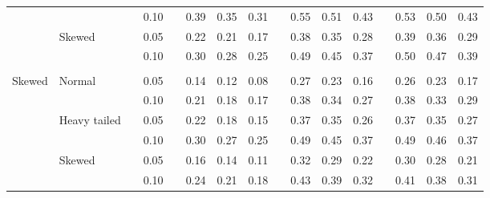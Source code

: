 \documentclass[12pt]{article} %
\begin{document}
\begin{table}[ht]
\begin{scriptsize}
\begin{center}
\begin{tabular}{ll p{.1cm} c p{.1cm} rrr p{.1cm} rrr p{.1cm} rrr}
             &              && 0.10 &&   0.39 & 0.35 & 0.31 && 0.55 & 0.51 & 0.43 &&  0.53 & 0.50 & 0.43 \\
             & Skewed       && 0.05 &&   0.22 & 0.21 & 0.17 && 0.38 & 0.35 & 0.28 &&  0.39 & 0.36 & 0.29 \\
             &              && 0.10 &&   0.30 & 0.28 & 0.25 && 0.49 & 0.45 & 0.37 &&  0.50 & 0.47 & 0.39 \\
             &&&&&&&&&&&&&&&\\
Skewed       & Normal       && 0.05 &&   0.14 & 0.12 & 0.08 && 0.27 & 0.23 & 0.16 &&  0.26 & 0.23 & 0.17 \\
             &              && 0.10 &&   0.21 & 0.18 & 0.17 && 0.38 & 0.34 & 0.27 &&  0.38 & 0.33 & 0.29 \\
             & Heavy tailed && 0.05 &&   0.22 & 0.18 & 0.15 && 0.37 & 0.35 & 0.26 &&  0.37 & 0.35 & 0.27 \\
             &              && 0.10 &&   0.30 & 0.27 & 0.25 && 0.49 & 0.45 & 0.37 &&  0.49 & 0.46 & 0.37 \\
             & Skewed       && 0.05 &&   0.16 & 0.14 & 0.11 && 0.32 & 0.29 & 0.22 &&  0.30 & 0.28 & 0.21 \\
             &              && 0.10 &&   0.24 & 0.21 & 0.18 && 0.43 & 0.39 & 0.32 &&  0.41 & 0.38 & 0.31 \\



\end{tabular}
\end{center}
\end{scriptsize}
\end{table}
\end{document}
